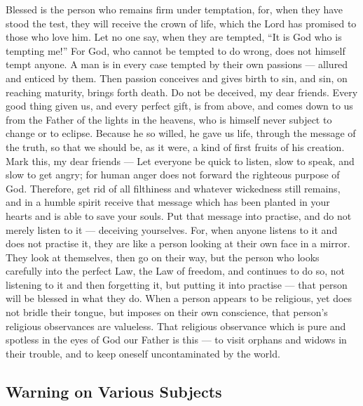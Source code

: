 Blessed is the person who remains firm under temptation,
for, when they have stood the test, they will receive the crown of life,
which the Lord has promised to those who love him.  Let no
one say, when they are tempted, ``It is God who is tempting me!'' For
God, who cannot be tempted to do wrong, does not himself tempt anyone.
 A man is in every case tempted by their own passions ---
allured and enticed by them.  Then passion conceives and
gives birth to sin, and sin, on reaching maturity, brings forth death.
 Do not be deceived, my dear friends.  Every
good thing given us, and every perfect gift, is from above, and comes
down to us from the Father of the lights in the heavens, who is himself
never subject to change or to eclipse.  Because he so
willed, he gave us life, through the message of the truth, so that we
should be, as it were, a kind of first fruits of his creation.
 Mark this, my dear friends --- Let everyone be quick to
listen, slow to speak, and slow to get angry;  for human
anger does not forward the righteous purpose of God. 
Therefore, get rid of all filthiness and whatever wickedness still
remains, and in a humble spirit receive that message which has been
planted in your hearts and is able to save your souls.  Put
that message into practise, and do not merely listen to it --- deceiving
yourselves.  For, when anyone listens to it and does not
practise it, they are like a person looking at their own face in a
mirror.  They look at themselves, then go on their way,
 but the person who looks carefully into the perfect Law,
the Law of freedom, and continues to do so, not listening to it and then
forgetting it, but putting it into practise --- that person will be
blessed in what they do.  When a person appears to be
religious, yet does not bridle their tongue, but imposes on their own
conscience, that person's religious observances are valueless.
 That religious observance which is pure and spotless in
the eyes of God our Father is this --- to visit orphans and widows in
their trouble, and to keep oneself uncontaminated by the world.

\hypertarget{warning-on-various-subjects}{%
\subsection{Warning on Various
Subjects}\label{warning-on-various-subjects}}

